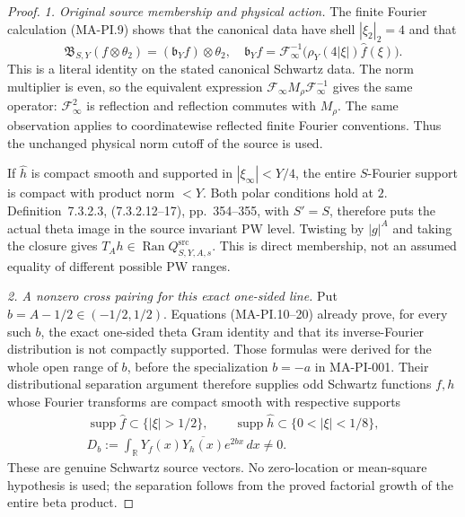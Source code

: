 \begin{proof}
\emph{1. Original source membership and physical action.}
The finite Fourier calculation (MA-PI.9) shows that the
canonical data have shell $|\xi_2|_2=4$ and that
\[
 \mathfrak B_{S,Y}(f\otimes\theta_2)
       =(\mathfrak b_Yf)\otimes\theta_2,
 \quad
 \mathfrak b_Yf=\mathcal F_\infty^{-1}
                      \bigl(\rho_Y(4|\xi|)\widehat f(\xi)\bigr).
 \tag{MA-PI.38}
\]
This is a literal identity on the stated canonical Schwartz
data.  The norm multiplier is even, so the equivalent
expression $\mathcal F_\infty M_\rho\mathcal F_\infty^{-1}$
gives the same operator: $\mathcal F_\infty^2$ is reflection
and reflection commutes with $M_\rho$.  The same observation
applies to coordinatewise reflected finite Fourier conventions.
Thus the unchanged physical norm cutoff of the source is used.

If $\widehat h$ is compact smooth and supported in
$|\xi_\infty|<Y/4$, the entire $S$-Fourier support is
compact with product norm $<Y$.  Both polar conditions
hold at $2$.  Definition~7.3.2.3, (7.3.2.12--17),
pp.~354--355, with $S'=S$, therefore puts the actual
theta image in the source invariant PW level.  Twisting
by $|g|^A$ and taking the closure gives
$T_Ah\in\operatorname{Ran}Q^{\mathrm{src}}_{S,Y,A,s}$.
This is direct membership, not an assumed equality of
different possible PW ranges.

\emph{2. A nonzero cross pairing for this exact one-sided line.}
Put $b=A-1/2\in(-1/2,1/2)$.
Equations (MA-PI.10--20) already prove, for every such $b$,
the exact one-sided theta Gram identity and that its
inverse-Fourier distribution is not compactly supported.
Those formulas were derived for the whole open range of
$b$, before the specialization $b=-a$ in MA-PI-001.
Their distributional separation argument therefore
supplies odd Schwartz functions $f,h$ whose Fourier
transforms are compact smooth with respective supports
\[
 \begin{gathered}
 \operatorname{supp}\widehat f\subset\{|\xi|>1/2\},\qquad
 \operatorname{supp}\widehat h\subset\{0<|\xi|<1/8\},\\
 D_b:=\int_{\mathbb R}Y_f(x)\overline{Y_h(x)}e^{2bx}\,dx\ne0.
 \end{gathered}
 \tag{MA-PI.39}
\]
These are genuine Schwartz source vectors.  No zero-location
or mean-square hypothesis is used; the separation follows
from the proved factorial growth of the entire beta product.


\end{proof}
